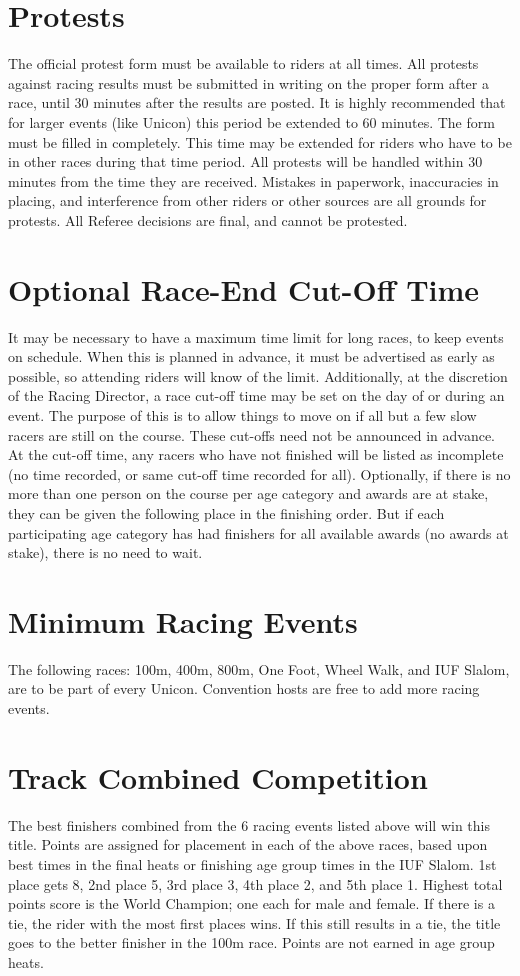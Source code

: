 \section{Protests}
The official protest form must be available to riders at all times.
All protests against racing results must be submitted in writing on the proper form after a race, until 30 minutes after the results are posted.
It is highly recommended that for larger events (like Unicon) this period be extended to 60 minutes.
The form must be filled in completely.
This time may be extended for riders who have to be in other races during that time period.
All protests will be handled within 30 minutes from the time they are received.
Mistakes in paperwork, inaccuracies in placing, and interference from other riders or other sources are all grounds for protests.
All Referee decisions are final, and cannot be protested.

\section{Optional Race-End Cut-Off Time}
It may be necessary to have a maximum time limit for long races, to keep events on schedule.
When this is planned in advance, it must be advertised as early as possible, so attending riders will know of the limit.
Additionally, at the discretion of the Racing Director, a race cut-off time may be set on the day of or during an event.
The purpose of this is to allow things to move on if all but a few slow racers are still on the course.
These cut-offs need not be announced in advance.
At the cut-off time, any racers who have not finished will be listed as incomplete (no time recorded, or same cut-off time recorded for all).
Optionally, if there is no more than one person on the course per age category and awards are at stake, they can be given the following place in the finishing order.
But if each participating age category has had finishers for all available awards (no awards at stake), there is no need to wait.

\section{Minimum Racing Events \label{sec:track-field_minimum-racing-events}}
The following races: 100m, 400m, 800m, One Foot, Wheel Walk, and IUF Slalom, are to be part of every Unicon.
Convention hosts are free to add more racing events.

\section{Track Combined Competition}
The best finishers combined from the 6 racing events listed above will win this title.
Points are assigned for placement in each of the above races, based upon best times in the final heats or finishing age group times in the IUF Slalom.
1st place gets 8, 2nd place 5, 3rd place 3, 4th place 2, and 5th place 1.
Highest total points score is the World Champion; one each for male and female.
If there is a tie, the rider with the most first places wins.
If this still results in a tie, the title goes to the better finisher in the 100m race.
Points are not earned in age group heats.


